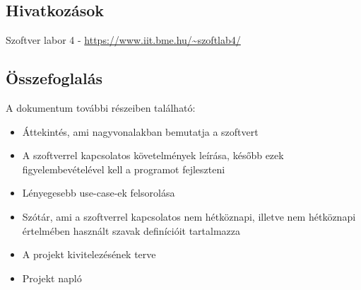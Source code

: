 \subsection{Hivatkozások}
Szoftver labor 4 - \url{https://www.iit.bme.hu/~szoftlab4/}

\subsection{Összefoglalás}
A dokumentum további részeiben található:
\begin{itemize}
\item Áttekintés, ami nagyvonalakban bemutatja a szoftvert
\item A szoftverrel kapcsolatos követelmények leírása, később ezek figyelembevételével kell a programot fejleszteni
\item Lényegesebb use-case-ek felsorolása
\item Szótár, ami a szoftverrel kapcsolatos nem hétköznapi, illetve nem hétköznapi értelmében használt szavak definícióit tartalmazza
\item A projekt kivitelezésének terve
\item Projekt napló
\end{itemize}

